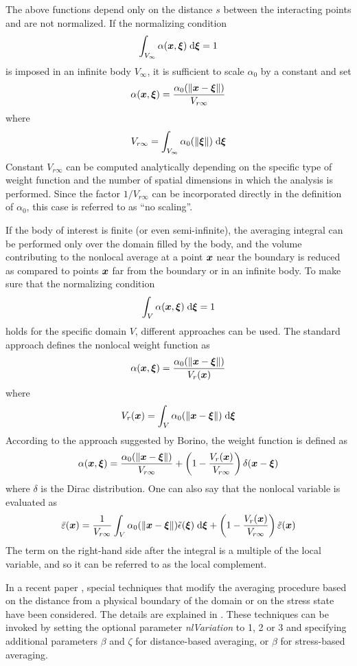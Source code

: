 \documentclass[a4paper]{article}
\newcommand{\mbf}[1]{\mbox{\boldmath$#1$}}
\begin{document}
The above functions depend only on the distance $s$ between the interacting
points and are not normalized. If the normalizing
condition
$$
\int_{V_\infty} \alpha(\mbf{x},\mbf{\xi})\;{\rm d}\mbf{\xi} = 1
$$
is imposed in an infinite body $V_{\infty}$, it is sufficient to scale
$\alpha_0$ by a constant and set
$$
\alpha(\mbf{x},\mbf{\xi})=\frac{\alpha_0(\Vert\mbf{x}-\mbf{\xi}\Vert)}{V_{r\infty}}
$$
where
$$
V_{r\infty} = \int_{V_\infty} \alpha_0(\Vert\mbf{\xi}\Vert)\;{\rm d}\mbf{\xi} 
$$
Constant $V_{r\infty}$ can be computed analytically depending on the specific
type of weight function and the number of spatial dimensions in which the
analysis is performed. Since the factor $1/V_{r\infty}$ can be incorporated directly
in the definition of $\alpha_0$, this case is referred to as ``no scaling''.

If the body of interest is finite (or even semi-infinite), the averaging
integral can be performed only over
the domain filled by the body, and the volume contributing to the nonlocal
average at a point $\mbf{x}$ near the boundary is reduced as compared to 
points  $\mbf{x}$ far from the boundary or in an infinite body. To make sure
that the normalizing condition
$$
\int_{V} \alpha(\mbf{x},\mbf{\xi})\;{\rm d}\mbf{\xi} = 1
$$
holds for the specific domain $V$, different approaches can be used.
The standard approach defines the nonlocal weight function as  
$$
\alpha(\mbf{x},\mbf{\xi})=\frac{\alpha_0(\Vert\mbf{x}-\mbf{\xi}\Vert)}{V_r(\mbf{x})}
$$
where
$$
V_r(\mbf{x}) = \int_{V} \alpha_0(\Vert\mbf{x}-\mbf{\xi}\Vert)\;{\rm d}\mbf{\xi} 
$$
According to the approach suggested by Borino, the weight function is defined as
$$
\alpha(\mbf{x},\mbf{\xi})=\frac{\alpha_0(\Vert\mbf{x}-\mbf{\xi}\Vert)}{V_{r\infty}} + \left(1-\frac{V_r(\mbf{x})}{V_{r\infty}}\right)\delta(\mbf{x}-\mbf{\xi})
$$
where $\delta$ is the Dirac distribution. One can also say that the
nonlocal variable is evaluated as
$$
\bar{\varepsilon}(\mbf{x}) = \frac{1}{V_{r\infty}}\int_V\alpha_0(\Vert\mbf{x}-\mbf{\xi}\Vert)\tilde\epsilon(\mbf{\xi})\;{\rm d}\mbf{\xi}+\left(1-\frac{V_r(\mbf{x})}{V_{r\infty}}\right)\tilde\varepsilon(\mbf{x})
$$
The term on the right-hand side after the integral is a multiple of the local
variable, and so it can be referred to as the local complement.  

In a recent paper \cite{Gra14}, special techniques that modify the averaging procedure based on the distance from a physical boundary of the domain or on the stress state have been considered. The details are explained in \cite{Gra14}. These techniques can be invoked by setting the optional parameter {\it nlVariation} to 1, 2 or 3 and specifying additional parameters $\beta$ and $\zeta$ for distance-based averaging, or $\beta$ for stress-based averaging.  
\end{document}
